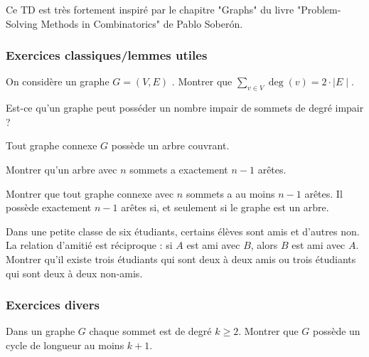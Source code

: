﻿Ce TD est très fortement inspiré par le chapitre "Graphs" du livre "Problem-Solving Methods in Combinatorics" de Pablo Soberón.

\subsubsection{Exercices classiques/lemmes utiles}

\begin{exo}

On considère un graphe $G=(V,E)$ . Montrer que $\sum_{v \in V} \deg(v) = 2 \cdot \mid E \mid$.

\end{exo}


\begin{exo}

Est-ce qu’un graphe peut posséder un nombre impair de sommets de degré impair ?

\end{exo}



\begin{exo}

Tout graphe connexe $G$ possède un arbre couvrant.

\end{exo}



\begin{exo}

Montrer qu’un arbre avec $n$ sommets a exactement $n-1$ arêtes.

\end{exo}

\begin{exo}

Montrer que tout graphe connexe avec $n$ sommets a au moins
$n-1$ arêtes. Il possède exactement $n-1$ arêtes si, et seulement si le graphe est un arbre.

\end{exo}


\begin{exo}

Dans une petite classe de six étudiants, certains élèves sont amis et d'autres non. La relation d'amitié est réciproque : si $A$ est ami avec $B$, alors $B$ est ami avec $A$. Montrer qu'il existe trois étudiants qui sont deux à deux amis ou trois étudiants qui sont deux à deux non-amis.

\end{exo}

\subsubsection{Exercices divers}
\begin{exo}

Dans un graphe $G$ chaque sommet est de degré $k\geq 2$. Montrer que $G$ possède un cycle de longueur au moins $k+1$.

\end{exo}

